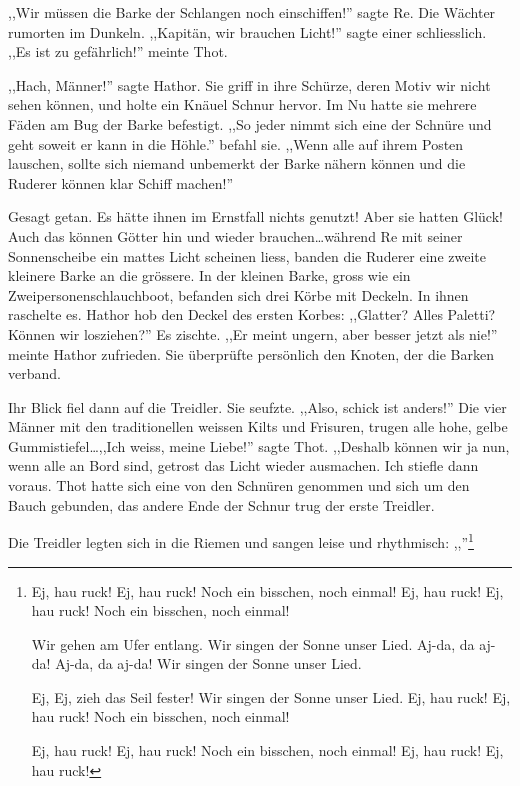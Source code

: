 \documentclass[11pt,titlepage,a5paper]{book}
\begin{document}
,,Wir müssen die Barke der Schlangen noch einschiffen!'' sagte Re. Die Wächter rumorten im Dunkeln. ,,Kapitän, wir brauchen Licht!''  sagte einer schliesslich. ,,Es ist zu gefährlich!'' meinte Thot.

,,Hach, Männer!'' sagte Hathor. Sie griff in ihre Schürze, deren Motiv wir nicht sehen können, und holte ein Knäuel Schnur hervor. Im Nu hatte sie mehrere Fäden am Bug der Barke befestigt. ,,So jeder nimmt sich eine der Schnüre und geht soweit er kann in die Höhle.'' befahl sie. ,,Wenn alle auf ihrem Posten lauschen, sollte sich niemand unbemerkt der Barke nähern können und die Ruderer können klar Schiff machen!''

Gesagt getan. Es hätte ihnen im Ernstfall nichts genutzt! Aber sie hatten Glück! Auch das können Götter hin und wieder brauchen\dots während Re mit seiner Sonnenscheibe ein mattes Licht scheinen liess, banden die Ruderer eine zweite kleinere Barke an die grössere. In der kleinen Barke, gross wie ein Zweipersonenschlauchboot, befanden sich drei Körbe mit Deckeln. In ihnen raschelte es. Hathor hob den Deckel des ersten Korbes: ,,Glatter? Alles Paletti? Können wir losziehen?'' Es zischte. ,,Er meint ungern, aber besser jetzt als nie!'' meinte Hathor zufrieden. Sie überprüfte persönlich den Knoten, der die Barken verband. 

Ihr Blick fiel dann auf die Treidler. Sie seufzte. ,,Also, schick ist anders!'' Die vier Männer mit den traditionellen weissen Kilts und Frisuren, trugen alle hohe, gelbe Gummistiefel\dots ,,Ich weiss, meine Liebe!'' sagte Thot. ,,Deshalb können wir ja nun, wenn alle an Bord sind, getrost das Licht wieder ausmachen. Ich stiefle dann voraus. Thot hatte sich eine von den Schnüren genommen und sich um den Bauch gebunden, das andere Ende der Schnur trug der erste Treidler.


Die Treidler legten sich in die Riemen und sangen leise und rhythmisch: ,,''\footnote{Ej, hau ruck!
Ej, hau ruck!
Noch ein bisschen, noch einmal!
Ej, hau ruck!
Ej, hau ruck!
Noch ein bisschen, noch einmal!

Wir gehen am Ufer entlang.
Wir singen der Sonne unser Lied.
Aj-da, da aj-da!
Aj-da, da aj-da!
Wir singen der Sonne unser Lied.

Ej, Ej, zieh das Seil fester!
Wir singen der Sonne unser Lied.
Ej, hau ruck!
Ej, hau ruck!
Noch ein bisschen, noch einmal!

Ej, hau ruck!
Ej, hau ruck!
Noch ein bisschen, noch einmal!
Ej, hau ruck!
Ej, hau ruck! }
\end{document}
